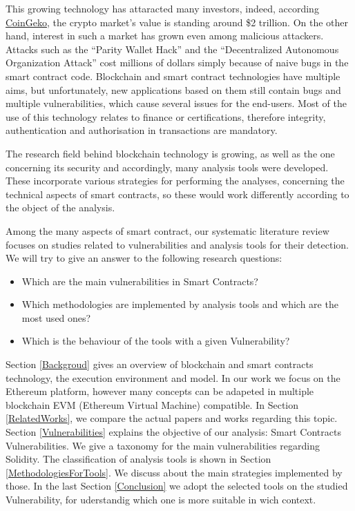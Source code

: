 \documentclass[a4paper,sigconf, language=french,
language=german, language=spanish, language=english]{acmart}
\begin{document}
This growing technology has attaracted many investors, indeed, according \href{https://www.coingecko.com/}{CoinGeko}, 
the crypto market's value is standing around \$2 trillion.
On the other hand, interest in such a market has grown even among malicious attackers. 
Attacks such as the “Parity Wallet Hack” and the “Decentralized Autonomous Organization Attack” cost millions of dollars simply because of 
naive bugs in the smart contract code. Blockchain and smart contract technologies have multiple aims, but unfortunately, new applications 
based on them still contain bugs and multiple vulnerabilities, which cause 
several issues for the end-users. Most of the use of this technology relates to finance or certifications, therefore integrity, 
authentication and authorisation in transactions are mandatory. 

The research field behind blockchain technology is growing, as well as the one concerning 
its security and accordingly, many analysis tools were developed. 
These incorporate various strategies for performing the analyses, concerning the technical aspects of smart contracts, 
so these would work differently according to the object of the analysis. 

Among the many aspects of smart contract, our systematic
literature review focuses on studies related to vulnerabilities and 
analysis tools for their detection. We will try to give an answer to the following 
research questions:
\begin{itemize}
    \item Which are the main vulnerabilities in Smart Contracts?
    \item Which methodologies are implemented by analysis tools and which are the most used ones?
    \item Which is the behaviour of the tools with a given Vulnerability?
\end{itemize}
Section \ref{Backgroud} gives an overview of blockchain and smart contracts technology, the execution environment and model. 
In our work we focus on the Ethereum platform, however many concepts can be adapeted in multiple blockchain EVM (Ethereum Virtual Machine) compatible.
In Section \ref{RelatedWorks}, we compare the actual papers and works regarding this topic. 
Section \ref{Vulnerabilities} explains the objective of our analysis: Smart Contracts Vulnerabilities. 
We give a taxonomy for the main vulnerabilities regarding Solidity. The classification of analysis tools 
is shown in Section \ref{MethodologiesForTools}. We discuss about the main strategies implemented by those.
In the last Section \ref{Conclusion} we adopt the selected tools on the studied Vulnerability, for uderstandig which one is 
more suitable in wich context. 
\end{document}
